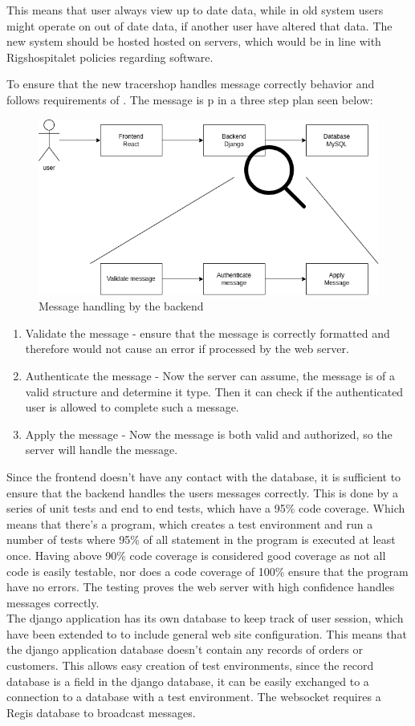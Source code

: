 \documentclass{article}
\begin{document}
This means that user always view up to date data, while in old system users might operate on out of date data, if another user have altered that data.
The new system should be hosted hosted on  servers, which would be in line with Rigshospitalet policies regarding software.

To ensure that the new tracershop handles message correctly behavior and follows requirements of . The message is p in a three step plan seen below:
\begin{figure}[ht]
  \begin{center}
    \includegraphics[width=0.6\linewidth]{MessageHandeling.png}
    \caption{Message handling by the backend}
    \label{fig:messageHandle}
  \end{center}
\end{figure}

\begin{enumerate}
  \item Validate the message - ensure that the message is correctly formatted and therefore would not cause an error if processed by the web server.
  \item Authenticate the message - Now the server can assume, the message is of a valid structure and determine it type.
  Then it can check if the authenticated user is allowed to complete such a message.
  \item Apply the message - Now the message is both valid and authorized, so the server will handle the message.
\end{enumerate}
Since the frontend doesn't have any contact with the database,
it is sufficient to ensure that the backend handles the users messages correctly.
This is done by a series of unit tests and end to end tests, which have a 95\% code coverage.
Which means that there's a program, which creates a test environment and run a number of tests where 95\% of all statement in the program is executed at least once.
Having above 90\% code coverage is considered good coverage as not all code is easily testable, nor does a code coverage of 100\% ensure that the program have no errors.
The testing proves the web server with high confidence handles messages correctly.\\
The django application has its own database to keep track of user session, which have been extended to to include general web site configuration.
This means that the django application database doesn't contain any records of orders or customers. This allows easy creation of test environments,
since the record database is a field in the django database, it can be easily exchanged to a connection to a database with a test environment.
The websocket requires a Regis database to broadcast messages.
\end{document}
